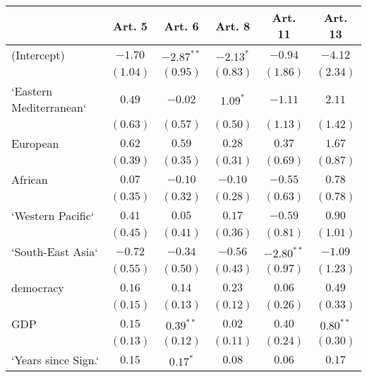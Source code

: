 
\begin{table}[!h]
\begin{center}
\begin{tabular}{l c c c c c }
\toprule
 & Art. 5 & Art. 6 & Art. 8 & Art. 11 & Art. 13 \\
\midrule
(Intercept)             & $-1.70$      & $-2.87^{**}$ & $-2.13^{*}$  & $-0.94$      & $-4.12$      \\
                        & $(1.04)$     & $(0.95)$     & $(0.83)$     & $(1.86)$     & $(2.34)$     \\
`Eastern Mediterranean` & $0.49$       & $-0.02$      & $1.09^{*}$   & $-1.11$      & $2.11$       \\
                        & $(0.63)$     & $(0.57)$     & $(0.50)$     & $(1.13)$     & $(1.42)$     \\
European                & $0.62$       & $0.59$       & $0.28$       & $0.37$       & $1.67$       \\
                        & $(0.39)$     & $(0.35)$     & $(0.31)$     & $(0.69)$     & $(0.87)$     \\
African                 & $0.07$       & $-0.10$      & $-0.10$      & $-0.55$      & $0.78$       \\
                        & $(0.35)$     & $(0.32)$     & $(0.28)$     & $(0.63)$     & $(0.78)$     \\
`Western Pacific`       & $0.41$       & $0.05$       & $0.17$       & $-0.59$      & $0.90$       \\
                        & $(0.45)$     & $(0.41)$     & $(0.36)$     & $(0.81)$     & $(1.01)$     \\
`South-East Asia`       & $-0.72$      & $-0.34$      & $-0.56$      & $-2.80^{**}$ & $-1.09$      \\
                        & $(0.55)$     & $(0.50)$     & $(0.43)$     & $(0.97)$     & $(1.23)$     \\
democracy               & $0.16$       & $0.14$       & $0.23$       & $0.06$       & $0.49$       \\
                        & $(0.15)$     & $(0.13)$     & $(0.12)$     & $(0.26)$     & $(0.33)$     \\
GDP                     & $0.15$       & $0.39^{**}$  & $0.02$       & $0.40$       & $0.80^{**}$  \\
                        & $(0.13)$     & $(0.12)$     & $(0.11)$     & $(0.24)$     & $(0.30)$     \\
`Years since Sign.`     & $0.15$       & $0.17^{*}$   & $0.08$       & $0.06$       & $0.17$       \\

\end{tabular}
\end{center}
\end{table}
